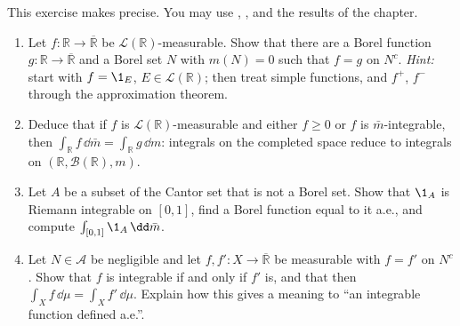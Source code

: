 \begin{exercise}\label{ex:ig-borel-version}
\medium This exercise makes  precise. You may use
, ,  and the
results of the chapter.
\begin{enumerate}[label=(\alph*)]
  \item Let $f:\mathbb R\to\overline{\mathbb R}$ be $\mathcal L(\mathbb R)$-measurable. Show
    that there are a Borel function $g:\mathbb R\to\overline{\mathbb R}$ and a Borel set $N$ with
    $m(N)=0$ such that $f=g$ on $N^c$. \emph{Hint:} start with $f=\1_E$, $E\in\mathcal L(\mathbb
    R)$; then treat simple functions, and $f^+$, $f^-$ through the approximation theorem.
  \item Deduce that if $f$ is $\mathcal L(\mathbb R)$-measurable and either $f\ge0$ or $f$ is
    $\bar m$-integrable, then $\int_{\mathbb R}f\,\dd\bar m=\int_{\mathbb R}g\,\dd m$: integrals on
    the completed space reduce to integrals on $(\mathbb R,\mathcal B(\mathbb R),m)$.
  \item Let $A$ be a subset of the Cantor set that is not a Borel set. Show that $\1_A$ is
    Riemann integrable on $[0,1]$, find a Borel function equal to it a.e., and compute
    $\int_{[0,1]}\1_A\,\dd\bar m$.
  \item Let $N\in\mathcal A$ be negligible and let $f,f':X\to\overline{\mathbb R}$ be measurable
    with $f=f'$ on $N^c$. Show that $f$ is integrable if and only if $f'$ is, and that then
    $\int_Xf\,\dd\mu=\int_Xf'\,\dd\mu$. Explain how this gives a meaning to ``an integrable
    function defined a.e.''.
\end{enumerate}
\end{exercise}

